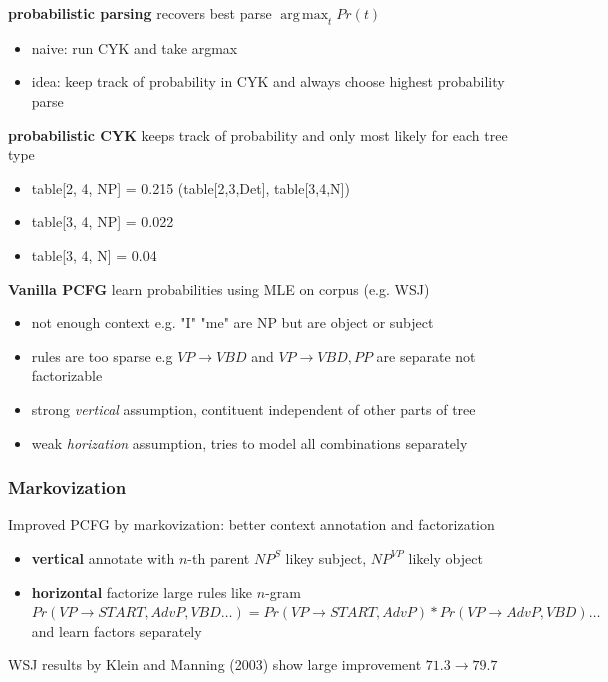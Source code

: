 \documentclass[]{article}
\DeclareMathOperator*{\argmax}{arg\,max}
\theoremstyle{definition}
\begin{document}
\textbf{probabilistic parsing} recovers best parse $\argmax_t Pr(t)$
\begin{itemize}
    \item naive: run CYK and take argmax
    \item idea: keep track of probability in CYK and always choose highest probability parse
\end{itemize}

\textbf{probabilistic CYK} keeps track of probability and only most likely for each tree type
\begin{itemize}
    \item table[2, 4, NP] = 0.215 (table[2,3,Det], table[3,4,N])
    \item table[3, 4, NP] = 0.022
    \item table[3, 4, N] = 0.04
\end{itemize}

\textbf{Vanilla PCFG} learn probabilities using MLE on corpus (e.g. WSJ)
\begin{itemize}
    \item not enough context e.g. "I" "me" are NP but are object or subject
    \item rules are too sparse e.g $VP \to VBD$ and $VP \to VBD,PP$ are separate not factorizable
    \item strong \textit{vertical} assumption, contituent independent of other parts of tree
    \item weak \textit{horization} assumption, tries to model all combinations separately
\end{itemize}

\subsubsection{Markovization}%
\label{ssub:markovization}

Improved PCFG by markovization: better context annotation and factorization
\begin{itemize}
    \item \textbf{vertical} annotate with $n$-th parent $NP^S$ likey subject, $NP^{VP}$ likely object
    \item \textbf{horizontal} factorize large rules like $n$-gram $Pr(VP \to START,AdvP,VBD \ldots) = Pr(VP \to START,AdvP) * Pr(VP \to AdvP,VBD) \ldots$ and learn factors separately
\end{itemize}

WSJ results by Klein and Manning (2003) show large improvement $71.3 \to 79.7$
\end{document}
